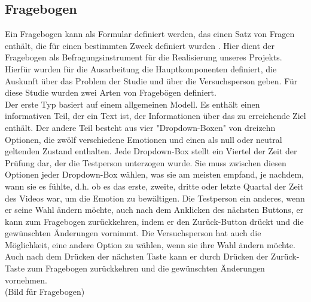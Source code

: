 \subsection{Fragebogen} \label{fragebogen-1}


Ein Fragebogen kann als Formular definiert werden, das einen Satz von Fragen enthält, die für einen bestimmten Zweck definiert wurden \cite{gault-questionnaire}.
Hier dient der Fragebogen als Befragungsinstrument für die Realisierung unseres Projekts. Hierfür wurden für die Ausarbeitung die Hauptkomponenten definiert, die Auskunft über das Problem der Studie und über die Versuchsperson geben. 
Für diese Studie wurden zwei Arten von Fragebögen definiert. \\

Der erste Typ basiert auf einem allgemeinen Modell. Es enthält einen informativen Teil, der ein Text ist, der Informationen über das zu erreichende Ziel enthält. Der andere Teil besteht aus vier "Dropdown-Boxen" von dreizehn Optionen, die zwölf verschiedene Emotionen und einen als null oder neutral geltenden Zustand enthalten. Jede Dropdown-Box stellt ein Viertel der Zeit der Prüfung dar, der die Testperson unterzogen wurde. Sie muss zwischen diesen Optionen jeder Dropdown-Box wählen, was sie am meisten empfand, je nachdem, wann sie es fühlte, d.h. ob es das erste, zweite, dritte oder letzte Quartal der Zeit des Videos war, um die Emotion zu bewältigen.  Die Testperson ein anderes, wenn er seine Wahl ändern möchte, auch nach dem Anklicken des nächsten Buttons, er kann zum Fragebogen zurückkehren, indem er den Zurück-Button drückt und die gewünschten Änderungen vornimmt. Die Versuchsperson hat auch die Möglichkeit, eine andere Option zu wählen, wenn sie ihre Wahl ändern möchte. Auch nach dem Drücken der nächsten Taste kann er durch Drücken der Zurück-Taste zum Fragebogen zurückkehren und die gewünschten Änderungen vornehmen. \\

(Bild für Fragebogen) \\

